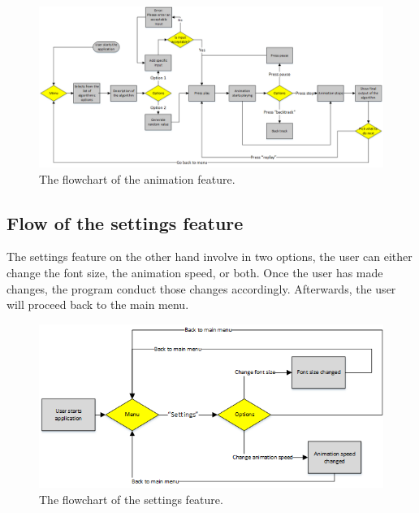 \begin{landscape}
\begin{figure}[H]
\centering
\hspace*{-2cm}
\includegraphics[scale=0.9]{images/report_images/flowchartAnimation.png}
\caption{The flowchart of the animation feature.}
\label{flowchartAnimation}
\end{figure}
\end{landscape}

\newpage

\subsection{Flow of the settings feature} \label{sec:flowchartSettings}
The settings feature on the other hand involve in two options, the user can either change the font size, the animation speed, or both. Once the user has made changes, the program conduct those changes accordingly. Afterwards, the user will proceed back to the main menu.

\begin{figure}[H]
\centering
\hspace*{-2cm}
\includegraphics[scale=0.9]{images/report_images/flowchartSettings.png}
\caption{The flowchart of the settings feature.}
\label{flowchartSettings}
\end{figure}

